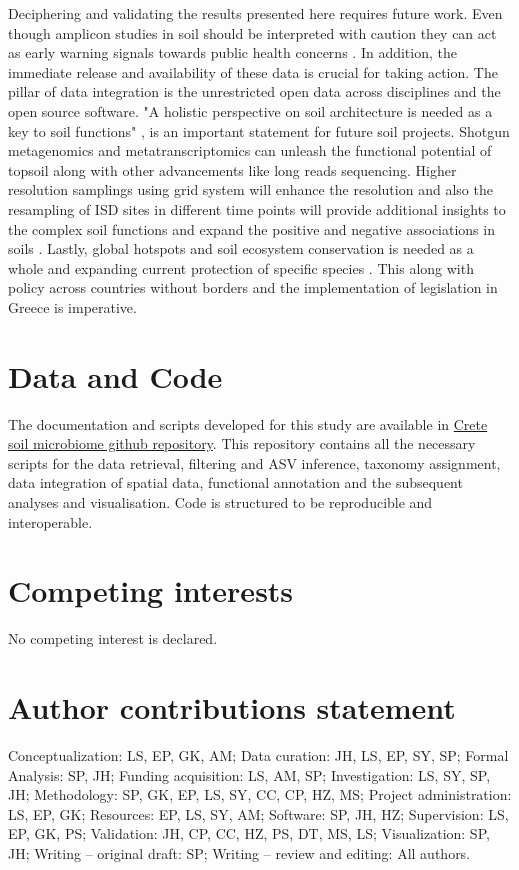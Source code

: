 Deciphering and validating the results presented here requires future work.
Even though amplicon studies in soil should be interpreted with caution \parencite{alteio2021} they 
can act as early warning signals towards public health concerns \parencite{banerjee2023Soil}.
In addition, the immediate release and availability of these data is crucial for 
taking action.
The pillar of data integration is the unrestricted open data across disciplines and 
the open source software.
"A holistic perspective on soil architecture is needed as a key to soil functions" \parencite{philippot2024the-interplay}, is 
an important statement for future soil projects.
Shotgun metagenomics and metatranscriptomics can unleash the functional potential of
topsoil along with other advancements like long reads sequencing. Higher resolution
samplings using grid system will enhance the resolution and also the resampling of
ISD sites in different time points will provide additional insights to the complex soil 
functions and expand the positive and negative associations in soils \parencite{Liu2024}.
Lastly, global hotspots \parencite{Guerra2022} and soil ecosystem conservation is needed as 
a whole and expanding current protection of specific species \parencite{guerra2021tracking}.
This along with policy \parencite{KONINGER2022} across countries \parencite{Putten2023}
without borders and the implementation of legislation in Greece \parencite{SCHISMENOS2022100035} is 
imperative.


\section{Data and Code}
The documentation and scripts developed for this study are available in
\href{https://github.com/savvas-paragkamian/crete_soil_microbiome/}{Crete soil microbiome github repository}.
This repository contains all the necessary scripts for the data retrieval,
filtering and ASV inference, taxonomy assignment, data integration of spatial data, 
functional annotation and the subsequent analyses and visualisation.
Code is structured to be reproducible and interoperable.

\section{Competing interests}
No competing interest is declared.

\section{Author contributions statement}
Conceptualization: LS, EP, GK, AM;
Data curation: JH, LS, EP, SY, SP;
Formal Analysis: SP, JH;
Funding acquisition: LS, AM, SP;
Investigation: LS, SY, SP, JH;
Methodology: SP, GK, EP, LS, SY, CC, CP, HZ, MS;
Project administration: LS, EP, GK;
Resources: EP, LS, SY, AM;
Software: SP, JH, HZ;
Supervision: LS, EP, GK, PS;
Validation: JH, CP, CC, HZ, PS, DT, MS, LS;
Visualization: SP, JH;
Writing – original draft: SP;
Writing – review and editing: All authors.

